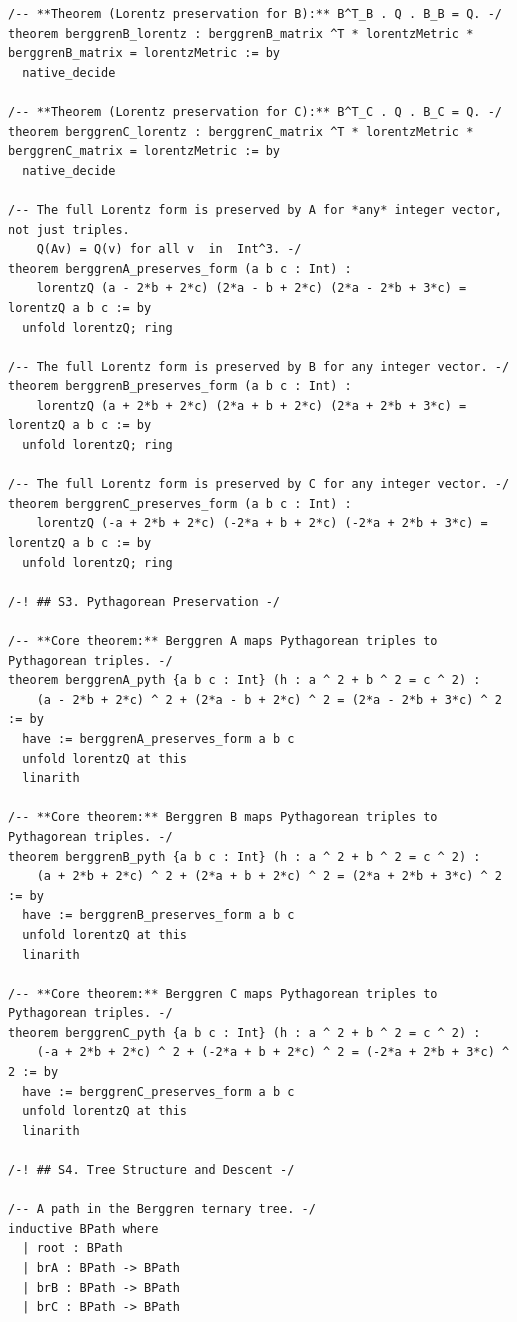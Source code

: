\documentclass[11pt,openright,twoside]{book}
\theoremstyle{definition}
\begin{document}
\begin{lstlisting}[style=lean]
/-- **Theorem (Lorentz preservation for B):** B^T_B . Q . B_B = Q. -/
theorem berggrenB_lorentz : berggrenB_matrix ^T * lorentzMetric * berggrenB_matrix = lorentzMetric := by
  native_decide

/-- **Theorem (Lorentz preservation for C):** B^T_C . Q . B_C = Q. -/
theorem berggrenC_lorentz : berggrenC_matrix ^T * lorentzMetric * berggrenC_matrix = lorentzMetric := by
  native_decide

/-- The full Lorentz form is preserved by A for *any* integer vector, not just triples.
    Q(Av) = Q(v) for all v  in  Int^3. -/
theorem berggrenA_preserves_form (a b c : Int) :
    lorentzQ (a - 2*b + 2*c) (2*a - b + 2*c) (2*a - 2*b + 3*c) = lorentzQ a b c := by
  unfold lorentzQ; ring

/-- The full Lorentz form is preserved by B for any integer vector. -/
theorem berggrenB_preserves_form (a b c : Int) :
    lorentzQ (a + 2*b + 2*c) (2*a + b + 2*c) (2*a + 2*b + 3*c) = lorentzQ a b c := by
  unfold lorentzQ; ring

/-- The full Lorentz form is preserved by C for any integer vector. -/
theorem berggrenC_preserves_form (a b c : Int) :
    lorentzQ (-a + 2*b + 2*c) (-2*a + b + 2*c) (-2*a + 2*b + 3*c) = lorentzQ a b c := by
  unfold lorentzQ; ring

/-! ## S3. Pythagorean Preservation -/

/-- **Core theorem:** Berggren A maps Pythagorean triples to Pythagorean triples. -/
theorem berggrenA_pyth {a b c : Int} (h : a ^ 2 + b ^ 2 = c ^ 2) :
    (a - 2*b + 2*c) ^ 2 + (2*a - b + 2*c) ^ 2 = (2*a - 2*b + 3*c) ^ 2 := by
  have := berggrenA_preserves_form a b c
  unfold lorentzQ at this
  linarith

/-- **Core theorem:** Berggren B maps Pythagorean triples to Pythagorean triples. -/
theorem berggrenB_pyth {a b c : Int} (h : a ^ 2 + b ^ 2 = c ^ 2) :
    (a + 2*b + 2*c) ^ 2 + (2*a + b + 2*c) ^ 2 = (2*a + 2*b + 3*c) ^ 2 := by
  have := berggrenB_preserves_form a b c
  unfold lorentzQ at this
  linarith

/-- **Core theorem:** Berggren C maps Pythagorean triples to Pythagorean triples. -/
theorem berggrenC_pyth {a b c : Int} (h : a ^ 2 + b ^ 2 = c ^ 2) :
    (-a + 2*b + 2*c) ^ 2 + (-2*a + b + 2*c) ^ 2 = (-2*a + 2*b + 3*c) ^ 2 := by
  have := berggrenC_preserves_form a b c
  unfold lorentzQ at this
  linarith

/-! ## S4. Tree Structure and Descent -/

/-- A path in the Berggren ternary tree. -/
inductive BPath where
  | root : BPath
  | brA : BPath -> BPath
  | brB : BPath -> BPath
  | brC : BPath -> BPath


\end{lstlisting}
\end{document}
